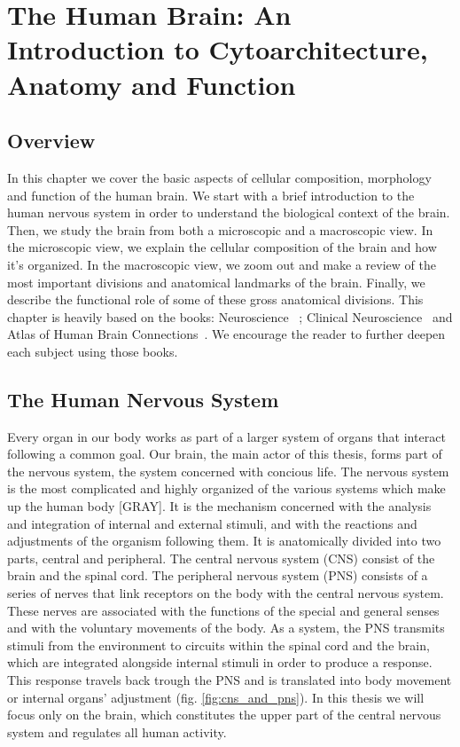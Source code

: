 
\chapter{The Human Brain: An Introduction to Cytoarchitecture, Anatomy and Function}

\section{Overview}
In this chapter we cover the basic aspects of cellular composition, morphology
and function of the human brain. We start with a brief introduction to the
human nervous system in order to understand the biological context of the brain.
Then, we study the brain from both a microscopic and a macroscopic view. In the
microscopic view, we explain the cellular composition of the brain and how it’s
organized. In the macroscopic view, we zoom out and make a review of the most 
important divisions and anatomical landmarks of the brain. Finally, we describe
the functional role of some of these gross anatomical divisions. This chapter is
heavily based on the books: Neuroscience~\cite{Purves2004} ; Clinical
Neuroscience~\cite{Johns} and Atlas of Human Brain Connections~\cite{Catani2012}.
We encourage the reader to further deepen each subject using those books.

\section{The Human Nervous System}
Every organ in our body works as part of a larger system of organs that
interact following a common goal. Our brain, the main actor of this thesis,
forms part of the nervous system, the system concerned with concious life.
The nervous system is the most complicated and highly organized of the various
systems which make up the human body [GRAY]. It is the mechanism concerned with
the analysis and integration of internal and external stimuli, and with the 
reactions and adjustments of the organism following them. It is anatomically
divided into two parts, central and peripheral. The central nervous system (CNS)
consist of the brain and the spinal cord. The peripheral nervous system (PNS) 
consists of a series of nerves that link receptors on the body with the central
nervous system. These nerves are associated with the functions of the special 
and general senses and with the voluntary movements of the body. As a system, 
the PNS transmits stimuli from the environment to circuits within the spinal 
cord and the brain, which are integrated alongside internal stimuli in order to
produce a response. This response travels back trough the PNS and is translated
into body movement or internal organs' adjustment (fig. \ref{fig:cns_and_pns}).
In this thesis we will focus only on the brain, which constitutes the upper part
of the central nervous system and regulates all human activity.

